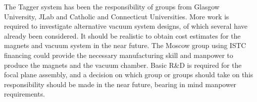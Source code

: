 The Tagger system has been the responsibility of groups from Glasgow 
University, JLab  and Catholic and Connecticut Universities.  More 
work is required to investigate alternative vacuum system designs,
of which several have already been considered. 
It should be realistic to obtain cost 
estimates for the magnets and vacuum system in the near future. 
The Moscow group using ISTC financing could provide the necessary 
manufacturing skill and manpower to produce the magnets and the 
vacuum chamber.  Basic R\&D is required for the focal plane 
assembly, and a decision on which group or groups should take 
on this responsibility should be made in the near future, 
bearing in mind manpower requirements.
